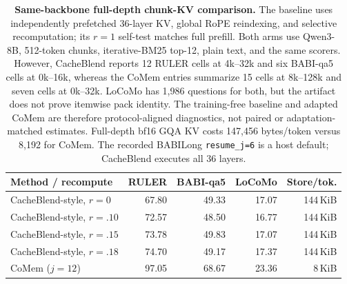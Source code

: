 \begin{table}[!t]
\centering
\scriptsize
\setlength{\tabcolsep}{3.2pt}
\begin{tabular}{@{}lrrrr@{}}
\toprule
\textbf{Method / recompute} & \textbf{RULER} & \textbf{BABI-qa5} &
\textbf{LoCoMo} & \textbf{Store/tok.} \\
\midrule
CacheBlend-style, $r{=}0$    & 67.80 & 49.33 & 17.07 & 144\,KiB \\
CacheBlend-style, $r{=}.10$  & 72.57 & 48.50 & 16.77 & 144\,KiB \\
CacheBlend-style, $r{=}.15$  & 73.78 & 49.83 & 17.07 & 144\,KiB \\
CacheBlend-style, $r{=}.18$  & 74.70 & 49.17 & 17.37 & 144\,KiB \\
\midrule
CoMem ($j{=}12$) & 97.05 & 68.67 & 23.36 & 8\,KiB \\
\bottomrule
\end{tabular}
\caption{\textbf{Same-backbone full-depth chunk-KV comparison.}
The baseline uses independently prefetched 36-layer KV, global RoPE reindexing,
and selective recomputation; its $r{=}1$ self-test matches full prefill. Both
arms use Qwen3-8B, 512-token chunks, iterative-BM25 top-12, plain text, and the
same scorers. However, CacheBlend reports 12 RULER cells at 4k--32k and six
BABI-qa5 cells at 0k--16k, whereas the CoMem entries summarize 15 cells at
8k--128k and seven cells at 0k--32k. LoCoMo has 1,986 questions for both, but
the artifact does not prove itemwise pack identity. The training-free baseline
and adapted CoMem are therefore protocol-aligned diagnostics, not paired or
adaptation-matched estimates. Full-depth bf16 GQA KV costs 147,456 bytes/token
versus 8,192 for CoMem. The recorded BABILong \texttt{resume\_j=6} is a host
default; CacheBlend executes all 36 layers.}
\label{tab:cacheblend-baseline}
\end{table}
